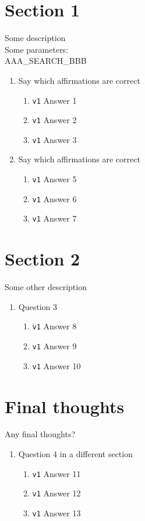 \documentclass{article}
\begin{document}
\section{Section 1}
Some description\\
Some parameters: %
\\ 
AAA_SEARCH_BBB\\
\begin{enumerate}
\item Say which affirmations are correct
\begin{enumerate}
	\item \verb+v1+ Answer 1
	\item \verb+v1+ Answer 2
	\item \verb+v1+ Answer 3
\end{enumerate}

\item Say which affirmations are correct
\begin{enumerate}	
	\item \verb+v1+ Answer 5
	\item \verb+v1+ Answer 6
	\item \verb+v1+ Answer 7
\end{enumerate}
\end{enumerate}
\section{Section 2}
Some other description	
\begin{enumerate}[resume]

\item Question 3
\begin{enumerate}
	\item \verb+v1+ Answer 8
	\item \verb+v1+ Answer 9
	\item \verb+v1+ Answer 10
\end{enumerate}

\end{enumerate}
\section{Final thoughts}
Any final thoughts?
\begin{enumerate}[resume]
\item Question 4 in a different section
\begin{enumerate}
	\item \verb+v1+ Answer 11
	\item \verb+v1+ Answer 12
	\item \verb+v1+ Answer 13
\end{enumerate}

\end{enumerate}

\end{document}
